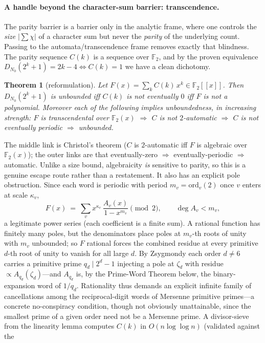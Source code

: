 \documentclass[11pt]{article}
\newtheorem{theorem}{Theorem}
\theoremstyle{remark}\newtheorem{remark}[theorem]{Remark}
\begin{document}
\paragraph{A handle beyond the character-sum barrier: transcendence.} The parity barrier is a barrier
only in the analytic frame, where one controls the \emph{size} $|\sum\chi|$ of a character sum but
never the \emph{parity} of the underlying count. Passing to the automata/transcendence frame removes
exactly that blindness. The parity sequence $C(k)$ is a sequence over $\mathbb F_2$, and by the proven
equivalence $D_{N_0}(2^k+1)=2k-4\iff C(k)=1$ we have a clean dichotomy.
\begin{theorem}[reformulation]\label{thm:transc}
Let $F(x)=\sum_k C(k)\,x^k\in\mathbb F_2[[x]]$. Then $D_{N_0}(2^k+1)$ is unbounded iff $C(k)$ is not
eventually $0$ iff $F$ is not a polynomial. Moreover each of the following implies unboundedness, in
increasing strength: $F$ is transcendental over $\mathbb F_2(x)$ $\Rightarrow$ $C$ is not
$2$-automatic $\Rightarrow$ $C$ is not eventually periodic $\Rightarrow$ unbounded.
\end{theorem}
\noindent The middle link is Christol's theorem ($C$ is $2$-automatic iff $F$ is algebraic over
$\mathbb F_2(x)$); the outer links are that eventually-zero $\Rightarrow$ eventually-periodic
$\Rightarrow$ automatic. Unlike a size bound, algebraicity \emph{is} sensitive to parity, so this is a
genuine escape route rather than a restatement. It also has an explicit pole obstruction. Since each
word is periodic with period $m_v=\mathrm{ord}_v(2)$ once $v$ enters at scale $\kappa_v$,
\[
   F(x)\ =\ \sum_v x^{\kappa_v}\,\frac{A_v(x)}{1-x^{m_v}}\pmod 2,\qquad \deg A_v<m_v ,
\]
a legitimate power series (each coefficient is a finite sum). A rational function has finitely many
poles, but the denominators place poles at $m_v$-th roots of unity with $m_v$ unbounded; so $F$
rational forces the combined residue at every primitive $d$-th root of unity to vanish for all large
$d$. By Zsygmondy each order $d\neq6$ carries a primitive prime $q_d\mid2^d-1$ injecting a pole at
$\zeta_d$ with residue $\propto A_{q_d}(\zeta_d)$---and $A_{q_d}$ is, by the Prime-Word Theorem below,
the binary-expansion word of $1/q_d$. Rationality thus demands an explicit infinite family of
cancellations among the reciprocal-digit words of Mersenne primitive primes---a concrete no-conspiracy
condition, though not obviously unattainable, since the smallest prime of a given
order need not be a Mersenne prime.
A divisor-sieve from the linearity lemma computes $C(k)$ in $O(n\log\log n)$ (validated against the
\end{document}
